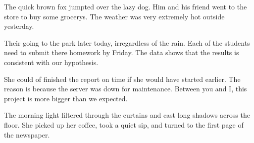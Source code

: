 \documentclass[12pt]{article}
\begin{document}
The quick brown fox jumpted over the lazy dog. Him and his friend went to the store to buy some grocerys. The weather was very extremely hot outside yesterday.

Their going to the park later today, irregardless of the rain. Each of the students need to submit there homework by Friday. The data shows that the results is consistent with our hypothesis.

She could of finished the report on time if she would have started earlier. The reason is because the server was down for maintenance. Between you and I, this project is more bigger than we expected.

The morning light filtered through the curtains and cast long shadows across the floor. She picked up her coffee, took a quiet sip, and turned to the first page of the newspaper.
\end{document}
